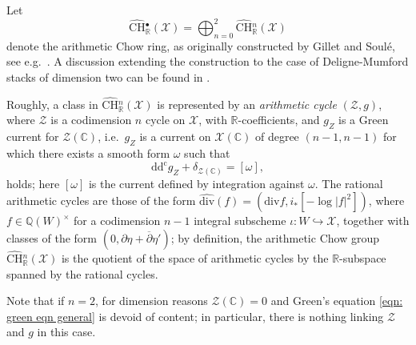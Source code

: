 \documentclass[reqno,oneside]{amsart}
\theoremstyle{plain}
\theoremstyle{remark}
\numberwithin{theorem}{section}
\newcommand{\bbC}{\mathbb C}
\newcommand{\bbQ}{\mathbb Q}
\newcommand{\bbR}{\mathbb R}
\newcommand{\calX}{\mathcal X}
\newcommand{\calZ}{\mathcal Z}
\newcommand{\ChowHat}[1]{\widehat{\mathrm{CH}}{}^{#1}}
\newcommand{\ddc} {\mathrm{dd^c}}
\begin{document}
	Let
	\begin{equation}
	\ChowHat{\bullet}_{\bbR}(\calX ) =  \bigoplus_{n=0}^2	\ChowHat{n}_{\bbR}(\calX)
	\end{equation}
	denote the arithmetic Chow ring, as originally constructed by Gillet and Soul\'e, see e.g.\ \cite{SouleBook}.    A  discussion extending the construction to the case of Deligne-Mumford stacks of dimension two can be found in \cite[\S 2]{KRYbook}.
	
	Roughly, a class in $\ChowHat{n}_{\bbR}(\calX)$ is represented by an \emph{arithmetic cycle} $(\calZ, g)$, where $\calZ$ is a codimension $n$ cycle on $\calX$, with $\bbR$-coefficients, and $g_Z$ is a Green current for $\calZ(\bbC)$, i.e.\ $g_Z$ is a current on $\calX(\bbC)$ of degree $(n-1,n-1)$ for which there exists a smooth form $\omega$ such that
	\begin{equation} \label{eqn: green eqn general}
	\ddc g_Z + \delta_{\calZ(\bbC)} = [\omega],
	\end{equation}
	holds; here $[\omega]$ is the current defined by integration against $\omega$. The rational arithmetic cycles are those of the form $\widehat{\mathrm{div}}(f) = (\mathrm{div}f, i_*[ - \log |f | ^2])$, where $f \in \bbQ(W)^{\times}$ for a codimension $n-1$ integral subscheme $\iota \colon W \hookrightarrow \calX$, together with classes of the form $(0, \partial \eta + \overline{\partial} \eta')$; by definition, the arithmetic Chow group $\ChowHat{n}_{\bbR}(\calX)$ is the quotient of the space of arithmetic cycles by the $\bbR$-subspace spanned by the rational cycles.
	
	Note that if $n=2$, for dimension reasons $\calZ(\bbC) =0$ and  Green's equation \eqref{eqn: green eqn general} is devoid of content; in particular, there is nothing linking $\calZ $ and $g$ in this case.
	
\end{document}
